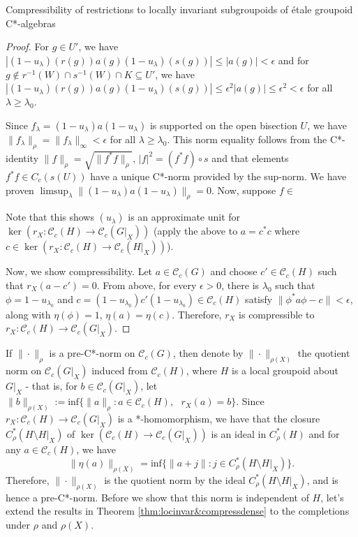 \documentclass[a4paper, 12pt]{amsart}
\theoremstyle{definition}
\theoremstyle{remark}
\numberwithin{equation}{section}
\begin{document}
\begin{section}{Compressibility of restrictions to locally invariant subgroupoids of \'etale groupoid C*-algebras}
\begin{proof}
    For $g\in U'$, we have $|(1-u_{\lambda})(r(g))a(g)(1-u_{\lambda})(s(g))|\leq |a(g)| < \epsilon$ and for $g\notin r^{-1}(W)\cap s^{-1}(W)\cap K\subseteq U'$, we have $|(1-u_{\lambda})(r(g))a(g)(1-u_{\lambda})(s(g))|\leq \epsilon^{2}|a(g)|\leq \epsilon^{2} < \epsilon $ for all $\lambda \geq \lambda_{0}$.

    Since $f_{\lambda} = (1-u_{\lambda})a(1-u_{\lambda})$ is supported on the open bisection $U$, we have $\|f_{\lambda}\|_{\rho} = \|f_{\lambda}\|_{\infty}  < \epsilon $ for all $\lambda\geq \lambda_{0}$. This norm equality follows from the C*-identity $\|f\|_{\rho} = \sqrt{\|f^{*}f\|_{\rho}}$,  $|f|^{2} = (f^{*}f)\circ s$ and that elements $f^{*}f\in C_{c}(s(U))$ have a unique C*-norm provided by the sup-norm. We have proven $\limsup_{\lambda}\|(1-u_{\lambda})a(1-u_{\lambda})\|_{\rho} = 0$. Now, suppose $f\in $ 
    
    
    Note that this shows $(u_{\lambda})$ is an approximate unit for $\ker(r_{X}:\mathscr{C}_{c}(H)\to \mathscr{C}_{c}(G|_{X}))$ (apply the above to $a = c^{*}c$ where $c\in \ker(r_{X}:\mathscr{C}_{c}(H)\to \mathscr{C}_{c}(H|_{X}))$).

    Now, we show compressibility. Let $a\in \mathscr{C}_{c}(G)$ and choose $c'\in \mathscr{C}_{c}(H)$ such that $r_{X}(a - c') = 0$. From above, for every $\epsilon > 0$, there is $\lambda_{0}$ such that $\phi = 1-u_{\lambda_{0}}$ and $c = (1-u_{\lambda_{0}})c'(1- u_{\lambda_{0}})\in\mathscr{C}_{c}(H)$ satisfy $\|\phi^{*}a\phi - c\| < \epsilon$, along with $\eta(\phi) = 1$, $\eta(a) = \eta(c)$. Therefore, $r_{X}$ is compressible to $r_{X}:\mathscr{C}_{c}(H)\to \mathscr{C}_{c}(G|_{X})$.
\end{proof}

If $\|\cdot\|_{\rho}$ is a pre-C*-norm on $\mathscr{C}_{c}(G)$, then denote by  $\|\cdot\|_{\rho(X)}$ the quotient norm on $\mathscr{C}_{c}(G|_{X})$ induced from $\mathscr{C}_{c}(H)$, where $H$ is a local groupoid about $G|_{X}$ - that is, for $b\in \mathscr{C}_{c}(G|_{X})$, let $\|b\|_{\rho(X)} := \text{inf}\{\|a\|_{\rho}:a\in\mathscr{C}_{c}(H), \text{ }r_{X}(a) = b\}$. Since $r_{X}:\mathscr{C}_{c}(H)\to \mathscr{C}_{c}(G|_{X})$ is a *-homomorphism, we have that the closure $C^{*}_{\rho}(H\setminus H|_{X})$ of $\ker(\mathscr{C}_{c}(H)\to \mathscr{C}_{c}(G|_{X}))$ is an ideal in $C^{*}_{\rho}(H)$ and for any $a\in \mathscr{C}_{c}(H)$, we have $$\|\eta(a)\|_{\rho(X)} = \text{inf}\{ \|a + j\|:j\in C^{*}_{\rho}(H\setminus H|_{X})\}.$$ Therefore, $\|\cdot\|_{\rho(X)}$ is the quotient norm by the ideal $C^{*}_{\rho}(H\setminus H|_{X})$, and is hence a pre-C*-norm. Before we show that this norm is independent of $H$, let's extend the results in Theorem \ref{thm:locinvar&compressdense} to the completions under $\rho$ and $\rho(X)$.



\end{section}
\end{document}

